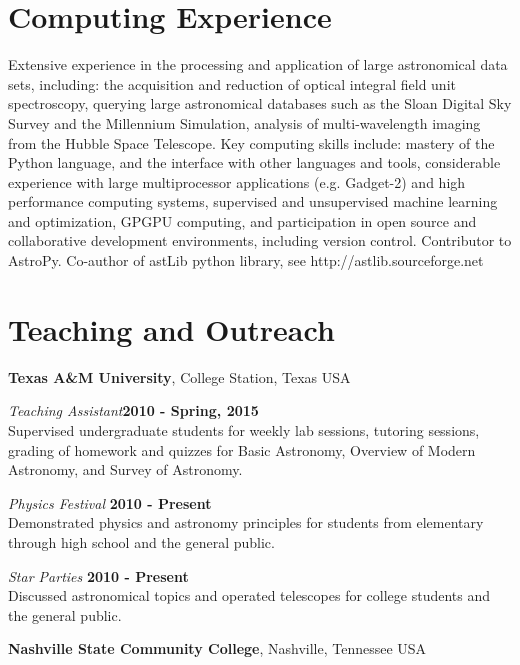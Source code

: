 \documentclass[margin,line, 11pt]{res}
\begin{document}
\begin{resume}
\section{\sc Computing Experience} 
Extensive experience in the processing and application of large astronomical data sets, including: the acquisition and reduction of optical integral field unit spectroscopy, querying large astronomical databases such as the Sloan Digital Sky Survey and the Millennium Simulation, analysis of multi-wavelength imaging from the Hubble Space Telescope. Key computing skills include: mastery of the Python language, and the interface with other languages and tools, considerable experience with large multiprocessor applications (e.g. Gadget-2) and high performance computing systems, supervised and unsupervised machine learning and optimization, GPGPU computing, and participation in open source and collaborative development environments, including version control. Contributor to {\sc AstroPy}. Co-author of {\sc astLib} python library, see http://astlib.sourceforge.net
\vspace*{-3mm}

\section{\sc Teaching and Outreach}
\textbf{Texas A\&M University}, College Station, Texas USA

\emph{Teaching Assistant}\hfill \textbf{2010 - Spring, 2015}\\
Supervised undergraduate students for weekly lab sessions, tutoring sessions, grading of homework and quizzes for Basic Astronomy, Overview of Modern Astronomy, and Survey of Astronomy.
\vspace*{-1mm}

\emph{Physics Festival} \hfill \textbf{2010 - Present}\\
Demonstrated physics and astronomy principles for students from elementary through high school and the general public.
\vspace*{-1mm}

\emph{Star Parties} \hfill \textbf{2010 - Present}\\
Discussed astronomical topics and operated telescopes for college students and the general public.
\vspace*{3mm}

\textbf{Nashville State Community College}, Nashville, Tennessee USA


\end{resume}
\end{document}
